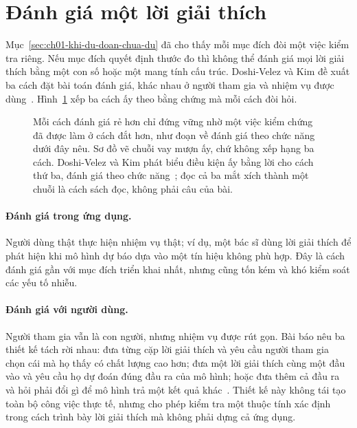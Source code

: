 \section{Đánh giá một lời giải thích}
\label{sec:ch01-danh-gia-giai-thich}

Mục~\ref{sec:ch01-khi-du-doan-chua-du} đã cho thấy mỗi mục đích đòi một việc
kiểm tra riêng. Nếu mục đích quyết định thước đo thì không thể đánh giá mọi
lời giải thích bằng một con số hoặc một  mang
tính cấu trúc. Doshi-Velez và Kim đề xuất ba cách đặt bài toán đánh giá, khác
nhau ở người tham gia và nhiệm vụ được dùng~\autocite{p14rigorous}.
Hình~\ref{fig:ch01-ba-cach-danh-gia} xếp ba cách ấy theo bằng chứng mà mỗi
cách đòi hỏi.

\begin{figure}[htbp]
  \centering
  
  \caption{Mỗi cách đánh giá rẻ hơn chỉ đứng vững nhờ một việc kiểm chứng đã
  được làm ở cách đắt hơn, như đoạn về đánh giá theo chức năng dưới đây nêu.
  Sơ đồ vẽ chuỗi vay mượn ấy, chứ không xếp hạng ba
  cách. Doshi-Velez và Kim phát biểu điều kiện ấy bằng lời cho cách thứ ba,
  đánh giá theo chức năng~\autocite{p14rigorous}; đọc cả ba mắt xích thành một
  chuỗi là cách sách đọc, không phải câu của bài.}
  \label{fig:ch01-ba-cach-danh-gia}
\end{figure}

\paragraph{Đánh giá trong ứng dụng.} Người dùng thật thực hiện nhiệm vụ thật;
ví dụ, một bác sĩ dùng lời giải thích để phát hiện khi mô hình dự báo dựa vào
một tín hiệu không phù hợp. Đây là cách đánh giá gần với mục đích triển khai
nhất, nhưng cũng tốn kém và khó kiểm soát các yếu tố nhiễu.

\paragraph{Đánh giá với người dùng.} Người tham gia vẫn là con người, nhưng
nhiệm vụ được rút gọn. Bài báo nêu ba thiết kế tách rời nhau: đưa từng cặp
lời giải thích và yêu cầu người tham gia chọn cái mà họ thấy có chất lượng cao
hơn; đưa một lời giải thích cùng một đầu vào và yêu cầu họ dự đoán đúng đầu ra
của mô hình; hoặc đưa thêm cả đầu ra và hỏi phải đổi gì để mô hình trả một kết
quả khác~\autocite{p14rigorous}. Thiết kế này không tái tạo toàn
bộ công việc thực tế, nhưng cho phép kiểm tra một thuộc tính xác định trong
cách trình bày lời giải thích mà không phải dựng cả ứng dụng.

